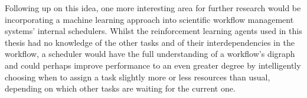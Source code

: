 Following up on this idea, one more interesting area for further research would be incorporating a machine learning approach into scientific workflow management systems’ internal schedulers. Whilst the reinforcement learning agents used in this thesis had no knowledge of the other tasks and of their interdependencies in the workflow, a scheduler would have the full understanding of a workflow’s digraph and could perhaps improve performance to an even greater degree by intelligently choosing when to assign a task slightly more or less resources than usual, depending on which other tasks are waiting for the current one. 

